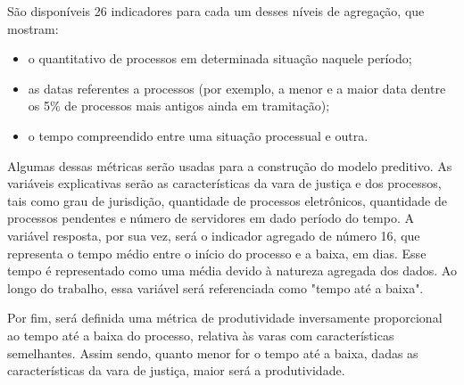 São disponíveis 26 indicadores para cada um desses níveis de agregação, que mostram: 

\begin{itemize}
    \item o quantitativo de processos em determinada situação naquele período;
    \item as datas referentes a processos (por exemplo, a menor e a maior data dentre os 5\% de processos mais antigos ainda em tramitação);
    \item o tempo compreendido entre uma situação processual e outra.
    
\end{itemize}

Algumas dessas métricas serão usadas para a construção do modelo preditivo. As variáveis explicativas serão as características da vara de justiça e dos processos, tais como grau de jurisdição, quantidade de processos eletrônicos, quantidade de processos pendentes e número de servidores em dado período do tempo. A variável resposta, por sua vez, será o indicador agregado de número 16, que representa o tempo médio entre o início do processo e a baixa, em dias. Esse tempo é representado como uma média devido à natureza agregada dos dados. Ao longo do trabalho, essa variável será referenciada como "tempo até a baixa".

Por fim, será definida uma métrica de produtividade inversamente proporcional ao tempo até a baixa do processo, relativa às varas com características semelhantes. Assim sendo, quanto menor for o tempo até a baixa, dadas as características da vara de justiça, maior será a produtividade.